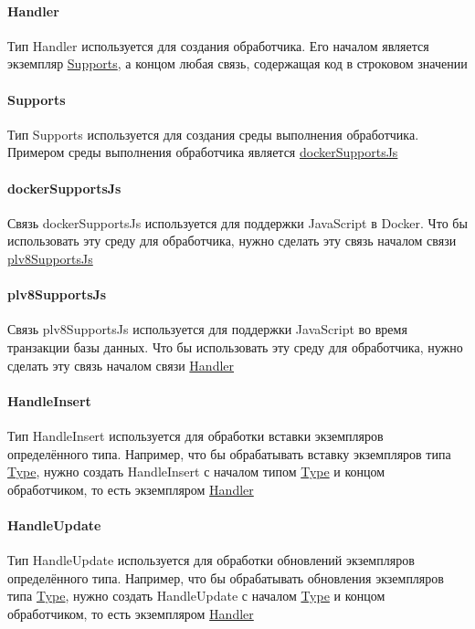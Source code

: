 \paragraph*{Handler}\hypertarget{Core.Handler.Description}{}
Тип Handler используется для создания обработчика.
Его началом является экземпляр \hyperlink{supports.Description}{Supports}, а
концом
любая связь, содержащая код в строковом значении
\paragraph*{Supports}\hypertarget{Core.Supports.Description}{}
Тип Supports используется для создания среды
выполнения обработчика. Примером среды выполнения обработчика является
\hyperlink{Core.dockerSupportsJs.Description}{dockerSupportsJs}
\paragraph*{dockerSupportsJs}\hypertarget{Core.dockerSupportsJs.Description}{}
Связь dockerSupportsJs используется для
поддержки JavaScript в Docker. Что бы использовать эту среду для обработчика,
нужно сделать эту связь началом связи
\hyperlink{Core.plv8SupportsJs.Description}{plv8SupportsJs}
\paragraph*{plv8SupportsJs}\hypertarget{Core.plv8SupportsJs.Description}{}
Связь plv8SupportsJs используется для
поддержки JavaScript во время транзакции базы данных. Что бы использовать эту среду для обработчика, 
нужно сделать эту связь началом связи
\hyperlink{Core.Handler.Description}{Handler}
\paragraph*{HandleInsert}\hypertarget{Core.HandleInsert.Description}{}
Тип HandleInsert используется для обработки
вставки экземпляров определённого типа. Например, что бы обрабатывать вставку
экземпляров типа \hyperlink{Core.Type.Description}{Type}, нужно создать
HandleInsert с
началом типом \hyperlink{Core.Type.Description}{Type} и концом обработчиком, то
есть
экземпляром \hyperlink{Core.Handler.Description}{Handler}
\paragraph*{HandleUpdate}\hypertarget{Core.HandleUpdate.Description}{}
Тип HandleUpdate используется для обработки
обновлений экземпляров определённого типа. Например, что бы обрабатывать
обновления экземпляров типа \hyperlink{Core.Type.Description}{Type}, нужно
создать
HandleUpdate с началом \hyperlink{Core.Type.Description}{Type} и концом
обработчиком,
то есть экземпляром \hyperlink{Core.Handler.Description}{Handler}
